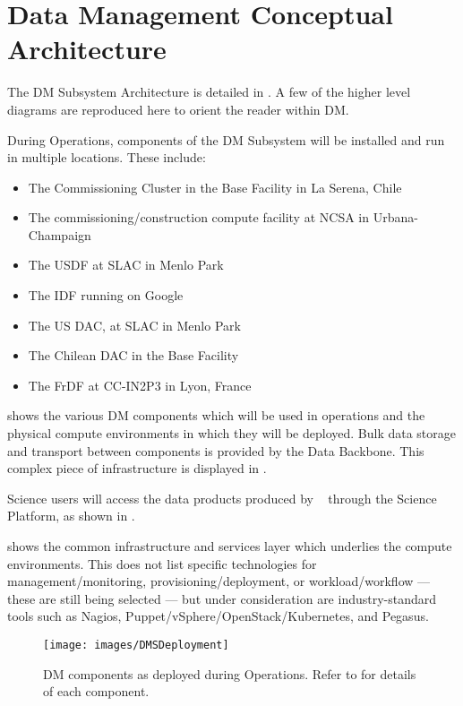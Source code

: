\section{Data Management Conceptual Architecture \label{sect:dmarc}}

The \gls{DM} \gls{Subsystem} Architecture is detailed in .
A few of the higher level diagrams are reproduced here to orient the reader within \gls{DM}.

During \gls{Operations}, components of the \gls{DM} \gls{Subsystem} will be installed and run in
multiple locations. These include:

\begin{itemize}
\item The \gls{Commissioning} Cluster in the \gls{Base Facility} in La Serena, Chile
\item The commissioning/construction compute facility at \gls{NCSA} in Urbana-Champaign
\item The \gls{USDF} at \gls{SLAC} in Menlo Park
\item The \gls{IDF} running on Google
\item The \gls{US} \gls{DAC},  at \gls{SLAC} in Menlo Park
\item The Chilean \gls{DAC} in the \gls{Base Facility}
\item The \gls{FrDF} at \gls{CC-IN2P3} in Lyon, France
\end{itemize}

 shows the various \gls{DM} components which will be used in operations and the physical compute environments in which they will be deployed.
Bulk data storage and transport between components is provided by the \gls{Data Backbone}. This complex piece of infrastructure is displayed in .

Science users will access the data products produced by \VRO~ through the
Science Platform, as shown in .

 shows the common infrastructure and services layer which underlies the compute environments.
This does not list specific technologies for management/monitoring, provisioning/deployment, or workload/workflow --- these are still being selected --- but under consideration are industry-standard tools such as Nagios, Puppet/vSphere/OpenStack/Kubernetes, and Pegasus.

\begin{figure}[htbp]
\begin{center}
\texttt{[image: images/DMSDeployment]}
\caption{DM components as deployed during \gls{Operations}. Refer to  for details of each component.}
\label{fig:dmsdeploy}
\end{center}
\end{figure}

